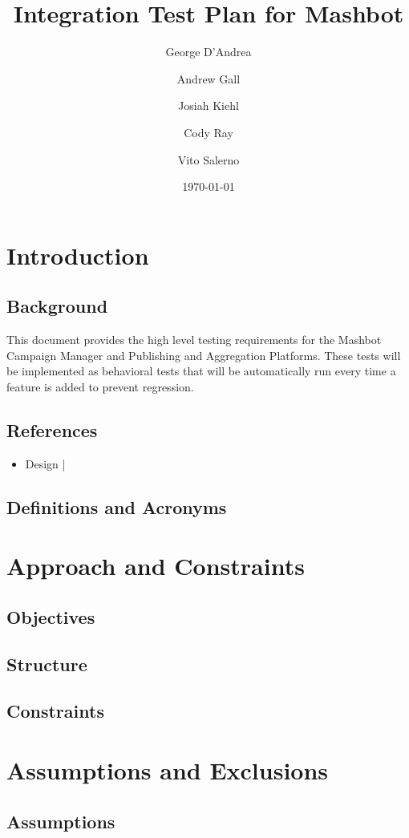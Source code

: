 \documentclass[12pt]{article}
\title{Integration Test Plan for Mashbot}
\author{George D'Andrea \and Andrew Gall \and Josiah Kiehl \and
  Cody Ray \and Vito Salerno}
\date{\today}
\begin{document}
\maketitle

\section{Introduction}
\subsection{Background}
This document provides the high level testing requirements for the Mashbot Campaign Manager and Publishing and Aggregation Platforms.  These tests will be implemented as behavioral tests that will be automatically run every time a feature is added to prevent regression.
\subsection{References}
\begin{itemize}
  \item Design | 
\end{itemize}
\subsection{Definitions and Acronyms}

\section{Approach and Constraints}
\subsection{Objectives}
\subsection{Structure}
\subsection{Constraints}

\section{Assumptions and Exclusions}
\subsection{Assumptions}
\end{document}
